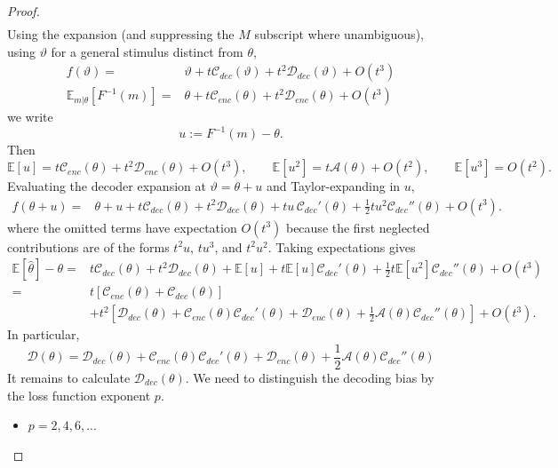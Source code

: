 \begin{proof}
\begin{align*}
\end{align*}
Using the expansion (and suppressing the $M$ subscript where unambiguous), using $\vartheta$ for a general stimulus distinct from $\theta$,
\begin{align*}
    f(\vartheta) = &\vartheta + t \mathcal{C}_{dec}(\vartheta) + t^2 \mathcal{D}_{dec}(\vartheta) + O(t^3) \\
    \mathbb{E}_{m|\theta}[F^{-1}(m)] =& \theta + t \mathcal{C}_{enc}(\theta) + t^2 \mathcal{D}_{enc}(\theta) + O(t^3) 
\end{align*}
we write
\[
u:=F^{-1}(m)-\theta.
\]
Then
\[
\mathbb E[u]=t\mathcal C_{enc}(\theta)+t^2\mathcal D_{enc}(\theta)+O(t^3),\qquad \mathbb E[u^2]=t\mathcal A(\theta)+O(t^2),\qquad \mathbb E[u^3]=O(t^2).
\]
Evaluating the decoder expansion at \(\vartheta=\theta+u\) and Taylor-expanding in \(u\),
\begin{align*}
    f(\theta+u)
    =& \theta+u+t\mathcal C_{dec}(\theta)+t^2\mathcal D_{dec}(\theta)+tu\,\mathcal C_{dec}'(\theta)+\frac12tu^2\mathcal C_{dec}''(\theta)+O(t^3).
\end{align*}
where the omitted terms have expectation \(O(t^3)\) because the first neglected contributions are of the forms \(t^2u\), \(tu^3\), and \(t^2u^2\). Taking expectations gives
\begin{align*}
    \mathbb E[\widehat\theta]-\theta
    =& t\mathcal C_{dec}(\theta)+t^2\mathcal D_{dec}(\theta)+\mathbb E[u]+t\mathbb E[u]\mathcal C_{dec}'(\theta)+\frac12 t\mathbb E[u^2]\mathcal C_{dec}''(\theta)+O(t^3) \\
    =& t[\mathcal C_{enc}(\theta)+\mathcal C_{dec}(\theta)] \\
    &+ t^2\left[\mathcal D_{dec}(\theta)+\mathcal C_{enc}(\theta)\mathcal C_{dec}'(\theta)+\mathcal D_{enc}(\theta)+\frac12\mathcal A(\theta)\mathcal C_{dec}''(\theta)\right]+O(t^3).
\end{align*}
In particular,
\begin{equation}
    \mathcal{D}(\theta) = \mathcal{D}_{dec}(\theta) + \mathcal{C}_{enc}(\theta) \mathcal{C}_{dec}'(\theta) +  \mathcal{D}_{enc}(\theta) +  \frac{1}{2}  \mathcal{A}(\theta)   \mathcal{C}_{dec}''(\theta)
\end{equation}
It remains to calculate $\mathcal{D}_{dec}(\theta)$.
We need to distinguish the decoding bias by the loss function exponent $p$. 
\begin{itemize}
    \item $p=2,4,6,...$


\end{itemize}
\end{proof}
